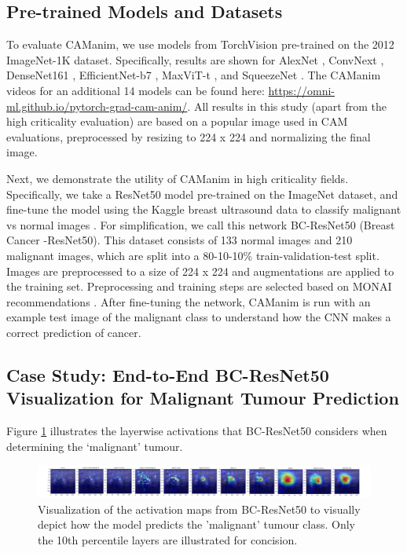 \documentclass[10pt, conference, compsocconf]{IEEEtran}
\begin{document}
\subsection{Pre-trained Models and Datasets}
\label{sec:datamodel}
To evaluate CAManim, we use models from TorchVision pre-trained on the 2012 ImageNet-1K dataset.  Specifically, results are shown for AlexNet \cite{}, ConvNext \cite{}, DenseNet161 \cite{}, EfficientNet-b7 \cite{}, MaxViT-t \cite{}, and SqueezeNet \cite{}. The CAManim videos for an additional 14 models can be found here: \url{https://omni-ml.github.io/pytorch-grad-cam-anim/}. All results in this study (apart from the high criticality evaluation) are based on a popular image used in CAM evaluations, preprocessed by resizing to 224 x 224 and normalizing the final image.

Next, we demonstrate the utility of CAManim in high criticality fields. Specifically, we take a ResNet50 model pre-trained on the ImageNet dataset, and fine-tune the model using the Kaggle breast ultrasound data to classify malignant vs normal images \cite{}{}{}. For simplification, we call this network BC-ResNet50 (Breast Cancer -ResNet50). This dataset consists of 133 normal images and 210 malignant images, which are split into a 80-10-10\% train-validation-test split. Images are preprocessed to a size of 224 x 224 and augmentations are applied to the training set. Preprocessing and training steps are selected based on MONAI recommendations \cite{}. After fine-tuning the network, CAManim is run with an example test image of the malignant class to understand how the CNN makes a correct prediction of cancer. 

\subsection{Case Study: End-to-End BC-ResNet50 Visualization for Malignant Tumour Prediction}
\label{sec:bcresnet}

Figure \ref{fig:mednet-viz} illustrates the layerwise activations that BC-ResNet50 considers when determining the 
`malignant' tumour.

\begin{figure}
    \centering
    \includegraphics[width=\textwidth]{figures/mednet-10percentile_final.pdf}
    \caption{Visualization of the activation maps from BC-ResNet50 to visually depict how the model predicts the 'malignant' tumour class. Only the 10th percentile layers are illustrated for concision.}
    \label{fig:mednet-viz}
\end{figure}
\end{document}
